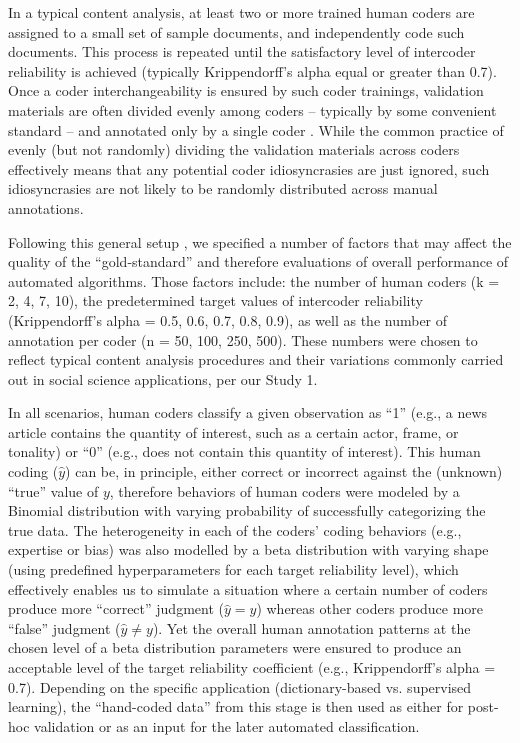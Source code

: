 \documentclass[man, 12pt, a4paper, nolmodern, noextraspace]{apa6}
\begin{document}
    In a typical content analysis, at least two or more trained human coders are assigned to a small set of sample documents, and independently code such documents. This process is repeated until the satisfactory level of intercoder reliability is achieved (typically Krippendorff’s alpha equal or greater than 0.7). Once a coder interchangeability is ensured by such coder trainings, validation materials are often divided evenly among coders -- typically by some convenient standard -- and annotated only by a single coder \parencite{grimmer2018unreliability}. While the common practice of evenly (but not randomly) dividing the validation materials across coders effectively means that any potential coder idiosyncrasies are just ignored, such idiosyncrasies are not likely to be randomly distributed across manual annotations.      
    
    Following this general setup \parencites[e.g.,][]{grimmer2018unreliability}, we specified a number of factors that may affect the quality of the “gold-standard” and therefore evaluations of overall performance of automated algorithms. Those factors include: the number of human coders (k = 2, 4, 7, 10), the predetermined target values of intercoder reliability (Krippendorff's alpha = 0.5, 0.6, 0.7, 0.8, 0.9), as well as the number of annotation per coder (n = 50, 100, 250, 500). These numbers were chosen to reflect typical content analysis procedures and their variations commonly carried out in social science applications, per our Study 1. 
    
    In all scenarios, human coders classify a given observation as ``1'' (e.g., a news article contains the quantity of interest, such as a certain actor, frame, or tonality) or ``0'' (e.g., does not contain this quantity of interest). This human coding ($\hat{y}$) can be, in principle, either correct or incorrect against the (unknown) “true” value of $y$, therefore behaviors of human coders were modeled by a Binomial distribution with varying probability of successfully categorizing the true data. The heterogeneity in each of the coders’ coding behaviors (e.g., expertise or bias) was also modelled by a beta distribution with varying shape (using predefined hyperparameters for each target reliability level), which effectively enables us to simulate a situation where a certain number of coders produce more “correct” judgment ($\hat{y} = y$) whereas other coders produce more ``false'' judgment ($\hat{y} \neq y$). Yet the overall human annotation patterns at the chosen level of a beta distribution parameters were ensured to produce an acceptable level of the target reliability coefficient (e.g., Krippendorff's alpha = 0.7). Depending on the specific application (dictionary-based vs. supervised learning), the \enquote{hand-coded data} from this stage is then used as either for post-hoc validation or as an input for the later automated classification. 
    
\end{document}
